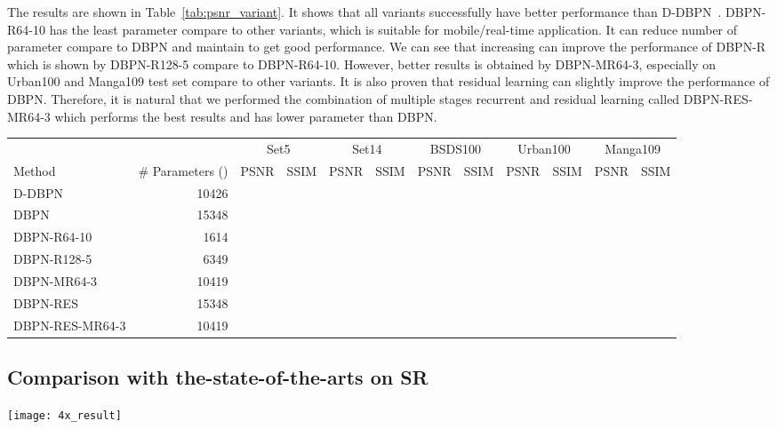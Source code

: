\documentclass[10pt,journal,compsoc]{IEEEtran}
\begin{document}
The results are shown in Table~\ref{tab:psnr_variant}. It shows that all variants successfully have better performance than D-DBPN~\cite{haris2018deep}.
DBPN-R64-10 has the least parameter compare to other variants, which is suitable for mobile/real-time application. It can reduce  number of parameter compare to DBPN and maintain to get good performance.
We can see that increasing  can improve the performance of DBPN-R which is shown by DBPN-R128-5 compare to DBPN-R64-10.
However, better results is obtained by DBPN-MR64-3, especially on Urban100 and Manga109 test set compare to other variants.
It is also proven that residual learning can slightly improve the performance of DBPN.
Therefore, it is natural that we performed the combination of multiple stages recurrent and residual learning called DBPN-RES-MR64-3 which performs the best results and has lower parameter than DBPN.

\begin{table*}[t!]
\scriptsize
\caption{Quantitative evaluation of DBPN's variants on 4. {\color{red}Red} indicates the best performance. }
\centering
\label{tab:psnr_variant}
\begin{tabular}{*1l*1r*2c*2c*2c*2c*2c}
\hline
 & &\multicolumn{2}{c}{Set5} & \multicolumn{2}{c}{Set14}& \multicolumn{2}{c}{BSDS100}& \multicolumn{2}{c}{Urban100}&\multicolumn{2}{c}{Manga109} \\         
Method & \# Parameters () &  PSNR&SSIM & PSNR&SSIM & PSNR&SSIM & PSNR&SSIM & PSNR&SSIM\\
\hline
D-DBPN~\cite{haris2018deep} &10426					&{}&{}&{}&{}&{}&{}&{}&{}&{}&{}\\
DBPN &15348					&&&&&&&&&&\\
DBPN-R64-10&{\color{red}1614}				&&&&&&&&&&\\
DBPN-R128-5&6349				&&&&&&&&&&\\
DBPN-MR64-3&10419				&&&&&&&&&&\\
DBPN-RES&15348				&&&&&&&&&&\\
DBPN-RES-MR64-3&10419				&{\color{red}}&{\color{red}}&{\color{red}}&{\color{red}}&{\color{red}}&{\color{red}}&{\color{red}}&{\color{red}}&{\color{red}}&{\color{red}}\\
\hline
\end{tabular}
\end{table*}

\subsection{Comparison with the-state-of-the-arts on SR}
\label{subsec:sota}
\begin{figure*}[t!]
\centering
\texttt{[image: 4x\_result]}
\caption{Qualitative comparison of our models with other works on  super-resolution.}
\label{figure:4x_result}
\end{figure*}
\end{document}
